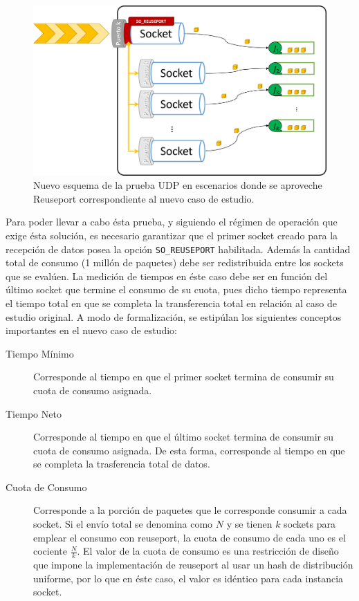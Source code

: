 \begin{figure}[!h]
	\centering
	\includegraphics[scale=.5]{imagenes/nuevocaso.png}
	\caption{Nuevo esquema de la prueba UDP en escenarios donde se aproveche Reuseport correspondiente al nuevo caso de estudio.}
	\label{fig:casoPruebaReuseport}
\end{figure}

Para poder llevar a cabo ésta prueba, y siguiendo el régimen de operación que exige ésta solución, es necesario garantizar que el primer socket creado para la recepción de datos posea la opción \verb=SO_REUSEPORT= habilitada. Además la cantidad total de consumo (1 millón de paquetes) debe ser redistribuida entre los sockets que se evalúen. La medición de tiempos en éste caso debe ser en función del último socket que termine el consumo de su cuota, pues dicho tiempo representa el tiempo total en que se completa la transferencia total en relación al caso de estudio original. A modo de formalización, se estipúlan los siguientes conceptos importantes en el nuevo caso de estudio:
\begin{description}
\item[Tiempo Mínimo] Corresponde al tiempo en que el primer socket termina de consumir su cuota de consumo asignada.
\item[Tiempo Neto] Corresponde al tiempo en que el último socket termina de consumir su cuota de consumo asignada. De esta forma, corresponde al tiempo en que se completa la trasferencia total de datos.
\item[Cuota de Consumo] Corresponde a la porción de paquetes que le corresponde consumir a cada socket. Si el envío total se denomina como $N$ y se tienen $k$ sockets para emplear el consumo con reuseport, la cuota de consumo de cada uno es el cociente $\frac{N}{k}$. El valor de la cuota de consumo es una restricción de diseño que impone la implementación de reuseport al usar un hash de distribución uniforme, por lo que en éste caso, el valor es idéntico para cada instancia socket.
\end{description}

